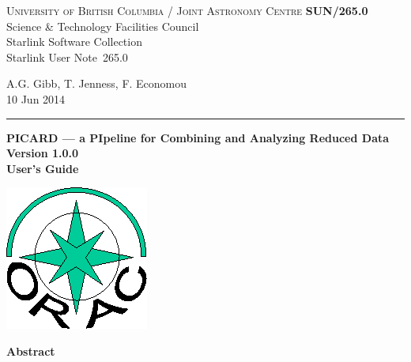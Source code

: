 \documentclass[twoside,11pt]{article}
\newcommand{\stardoccategory}  {Starlink User Note}
\newcommand{\stardocinitials}  {SUN}
\newcommand{\stardocnumber}    {265.0}
\newcommand{\stardocauthors}   {A.G. Gibb, T. Jenness, F. Economou}
\newcommand{\stardocdate}      {10 Jun 2014}
\newcommand{\stardoctitle}     {PICARD --- a PIpeline for Combining and Analyzing Reduced Data}
\newcommand{\stardocversion}   {Version 1.0.0}
\newcommand{\stardocmanual}    {User's Guide}
\newcommand{\stardocname}{\stardocinitials /\stardocnumber}
\newenvironment{latexonly}{}{}
\renewcommand{\_}{\texttt{\symbol{95}}}
\begin{document}
\thispagestyle{empty}

\begin{latexonly}
   \textsc{University of British Columbia} / \textsc{Joint Astronomy Centre} \hfill \textbf{\stardocname}\\
   {\large Science \& Technology Facilities Council}\\
   {\large Starlink Software Collection\\}
   {\large \stardoccategory\ \stardocnumber}
   \begin{flushright}
   \stardocauthors\\
   \stardocdate
   \end{flushright}
   \vspace{-4mm}
   \rule{\textwidth}{0.5mm}
   \vspace{5mm}
   \begin{center}
   {\Huge\textbf{\stardoctitle \\ [2.5ex]}}
   {\LARGE\textbf{\stardocversion \\ [4ex]}}
   {\Huge\textbf{\stardocmanual}}
   \end{center}
   \vspace{5mm}

\begin{center}
\includegraphics[scale=0.3]{sun265_logo}
\end{center}

   \vspace{10mm}
   \begin{center}
      {\Large\textbf{Abstract}}
   \end{center}
\end{latexonly}
\end{document}
